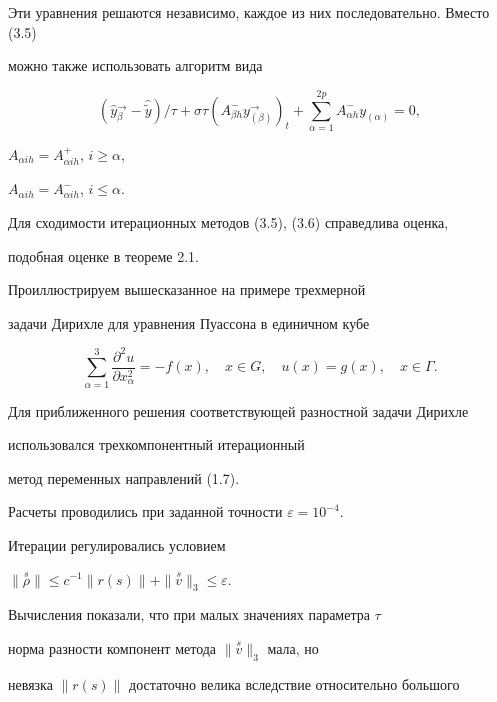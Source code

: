 Эти уравнения решаются независимо, каждое из них последовательно. Вместо (3.5)


можно также использовать алгоритм вида


\begin{equation}


(\widehat y{}_{\beta }^\to-\widehat {\widetilde y})/\tau+


\sigma\tau (A_{\beta h}^- y_{(\beta)}^\to)_t+\sum\limits_{\alpha=1}^{2p}


A_{\alpha h}^-y_{(\alpha)}=0,


\end{equation}


$A_{\alpha i h}=A_{\alpha i h}^+$, $i\ge\alpha$,


$A_{\alpha i h}=A_{\alpha i h}^-$, $i\le\alpha$.


Для сходимости итерационных методов (3.5), (3.6) справедлива оценка,


подобная оценке в теореме 2.1.





Проиллюстрируем вышесказанное на примере трехмерной


задачи Дирихле для уравнения Пуассона в единичном кубе


\begin{equation}


\sum_{\alpha=1}^3\frac{\partial^2u}{\partial x_\alpha^2}=


-f(x),\quad x\in G,\quad u(x)=g(x),\quad x\in\Gamma.


\end{equation}


Для приближенного решения соответствующей разностной задачи Дирихле 


использовался трехкомпонентный итерационный


метод переменных направлений (1.7).


Расчеты проводились при заданной точности $\varepsilon=10^{-4}$.


Итерации регулировались условием 


$\|{\overset{s}{\rho}}\|\leq c^{-1}\|r(s)\|+


\|{\overset{s}{v}}\|_3^{~}\leq \varepsilon$.


Вычисления показали, что при малых значениях параметра $\tau$


норма разности компонент метода $\|{\overset{s}{v}}\|_3$ мала, но


невязка $\|r(s)\|$ достаточно велика вследствие относительно большого


